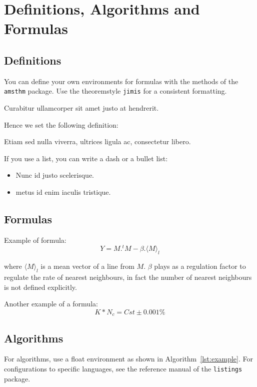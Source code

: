 \documentclass[jimisdraft]{jimis-en}
\begin{document}
\section{Definitions, Algorithms and Formulas}
\subsection{Definitions}
You can define your own environments for formulas with the methods of the \texttt{amsthm} package. Use the theoremstyle \texttt{jimis} for a consistent formatting.

\begin{definition}[alpha]
Curabitur ullamcorper sit amet justo at hendrerit.
\end{definition}

Hence we set the following definition:

\begin{definition}[beta]
Etiam sed nulla viverra, ultrices ligula ac, consectetur libero.
\end{definition}

If you use a list, you can write a dash or a bullet list:
\begin{itemize}
  \item Nunc id justo scelerisque.
  \item metus id enim iaculis tristique.
\end{itemize}


\subsection{Formulas}
Example of formula:
\begin{equation}
  Y=M.^tM-\beta.\langle M \rangle_l
\end{equation}

where $\langle M \rangle_l$ is a mean vector of a line from $M$. $\beta$ plays as a regulation factor to regulate the
rate of nearest neighbours, in fact the number of nearest neighbours is not defined explicitly.

Another example of a formula:
\begin{equation}
  K * N_c = Cst \pm 0.001\%
\end{equation}


\subsection{Algorithms}
For algorithms, use a float environment as shown in Algorithm~\ref{lst:example}. For configurations to specific languages, see the reference manual of the \texttt{listings} package.
\end{document}
